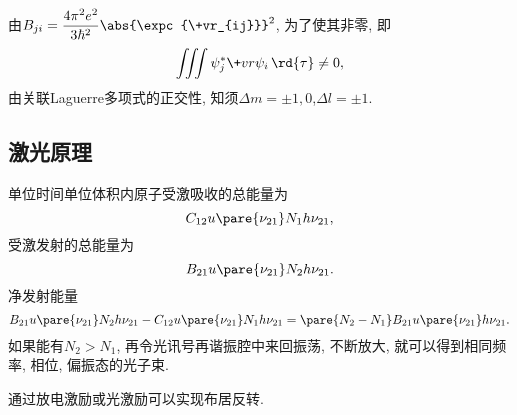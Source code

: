 \documentclass[hidelinks]{ctexart}
\begin{document}
由$\displaystyle B_{ji} = \frac{4\pi^2e^2}{3\hbar^2}\abs{\expc{\+vr_{ij}}}^2$, 为了使其非零, 即
\[ \iiint \psi_j^* \+vr \psi_i\,\rd{\tau}\neq 0, \]
由关联Laguerre多项式的正交性, 知须$\Delta m = \pm 1, 0$,\quad $\Delta l = \pm 1$.


\subsection{激光原理} %
\label{sub:激光原理}

单位时间单位体积内原子受激吸收的总能量为
\[ C_{12}u\pare{\nu_{21}}N_1h\nu_{21}, \]
受激发射的总能量为
\[ B_{21}u\pare{\nu_{21}}N_2h\nu_{21}. \]
净发射能量
\[ B_{21}u\pare{\nu_{21}}N_2h\nu_{21} - C_{12}u\pare{\nu_{21}}N_1h\nu_{21} = \pare{N_2 - N_1}B_{21}u\pare{\nu_{21}}h\nu_{21}. \]
如果能有$N_2>N_1$, 再令光讯号再谐振腔中来回振荡, 不断放大, 就可以得到相同频率, 相位, 偏振态的光子束.
\par
通过放电激励或光激励可以实现布居反转.


\end{document}
